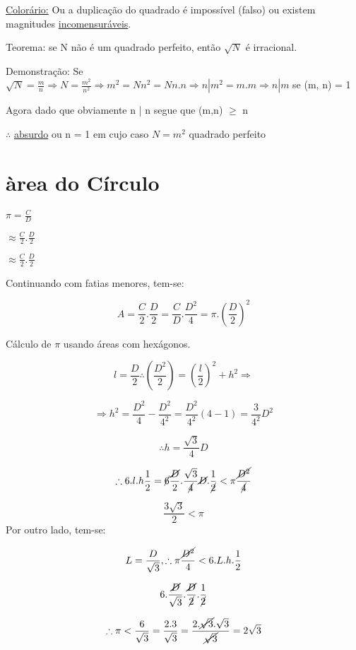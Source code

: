 \documentclass[a4paper, 12pt]{article}
\begin{document}
\underline{Colorário:} Ou a duplicação do quadrado é impossível (falso) ou existem magnitudes \underline{incomensuráveis}.

Teorema: se N não é um quadrado perfeito, então $\sqrt{N}$ é irracional.

Demonstração: Se $\sqrt{N} = \frac{m}{n} \Rightarrow N = \frac{m^2}{n^2} \Rightarrow m^2 = Nn^2 = Nn.n \Rightarrow n | m^2 = m.m \Rightarrow n | m$ se (m, n) = 1 

Agora dado que obviamente n | n segue que (m,n) $\ge$ n

$\therefore$ \underline{absurdo} ou n = 1 em cujo caso $N = m^2$ quadrado perfeito

\newpage

\section{àrea do Círculo}

$\pi = \frac{C}{D}$

$\approx\frac{C}{2}.\frac{D}{2}$

$\approx\frac{C}{2}.\frac{D}{2}$

Continuando com fatias menores, tem-se:

\[A = \frac{C}{2}.\frac{D}{2} = \frac{C}{D}.\frac{D^2}{4} = \pi.(\frac{D}{2})^2\]

Cálculo de $\pi$ usando áreas com hexágonos.

\[l = \frac{D}{2} \therefore (\frac{D^2}{2}) = (\frac{l}{2})^2 + h^2 \Rightarrow \]

\[\Rightarrow h^2 = \frac{D^2}{4} - \frac{D^2}{4^2} = \frac{D^2}{4^2} (4-1) = \frac{3}{4^2}D^2\]

\[\therefore h= \frac{\sqrt{3}}{4}D\]

\[\therefore 6.l.h\frac{1}{2} = \cancel{6} \frac{\cancel{D}}{2}.\frac{\sqrt{3}}{\cancel{4}}\cancel{D}.\frac{1}{\cancel{2}} <\pi\frac{\cancel{D^2}}{\cancel{4}}\]

\[\frac{3\sqrt{3}}{2} < \pi\]
Por outro lado, tem-se:

\[L= \frac{D}{\sqrt{3}}, \therefore \pi \frac{\cancel{D^2}}{4} < 6.L.h.\frac{1}{2}\]

\[6.\frac{\cancel{D}}{\sqrt{3}}.\frac{\cancel{D}}{\cancel{2}}.\frac{1}{\cancel{2}}\]

\[\therefore \pi < \frac{6}{\sqrt{3}} = \frac{2.3}{\sqrt{3}} = \frac{2.\cancel{\sqrt{3}}.\sqrt{3}}{\cancel{\sqrt{3}}} = 2\sqrt{3}\]
\end{document}
